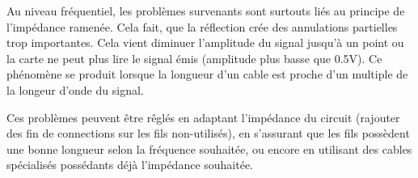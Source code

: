  Au niveau fréquentiel, les problèmes survenants sont surtouts liés au principe de l'impédance ramenée. Cela fait, que la réflection crée des annulations
 partielles trop importantes. Cela vient diminuer l'amplitude du signal jusqu'à un point ou la carte ne peut plus lire le signal émis (amplitude
 plus basse que 0.5V). Ce phénomène se produit lorsque la longueur d'un cable est proche d'un multiple de la longeur d'onde du signal.

 Ces problèmes peuvent être rêglés en adaptant l'impédance du circuit (rajouter des fin de connections sur les fils non-utilisés), en s'assurant
 que les fils possèdent une bonne longueur selon la fréquence souhaitée, ou encore en utilisant des cables spécialisés possédants déjà l'impédance
 souhaitée.